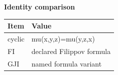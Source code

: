 \begin{center}
\textbf{Identity comparison}\par\smallskip
\begin{tabular}{ll}
\toprule
Item & Value \\
\midrule
cyclic & mu(x,y,z)=mu(y,z,x) \\
FI & declared Filippov formula \\
GJI & named formula variant \\
\bottomrule
\end{tabular}
\end{center}
